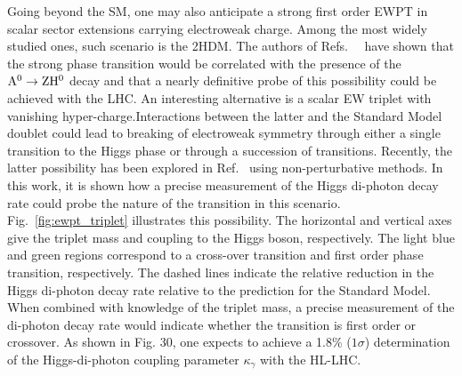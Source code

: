 Going beyond the SM, one may also anticipate a strong first order EWPT in scalar sector extensions carrying electroweak charge. Among the most widely studied ones, such scenario is the 2HDM. The authors of Refs.~~\cite{Dorsch:2013wja,Dorsch:2014qja} have shown that the strong phase transition would be correlated with the presence of the $\rm A^0\to Z H^0$ decay and that a nearly definitive probe of this possibility could be achieved with the LHC. An interesting alternative is a scalar EW triplet with vanishing hyper-charge.Interactions between the latter and the Standard Model doublet could lead to breaking of electroweak symmetry through either a single transition to the Higgs phase or through a succession of transitions\cite{Patel:2012pi}. Recently, the latter possibility has been explored in Ref.~\cite{Niemi:2018asa} using non-perturbative methods. In this work, it is shown how a precise measurement of the Higgs di-photon decay rate could probe the nature of the transition in this scenario. Fig.~\ref{fig:ewpt_triplet} illustrates this possibility. The horizontal and vertical axes give the triplet mass and coupling to the Higgs boson, respectively. The light blue and green regions correspond to a cross-over transition and first order phase transition, respectively. The dashed lines indicate the relative reduction in the Higgs di-photon decay rate relative to the prediction for the Standard Model. When combined with knowledge of the triplet mass, a precise measurement of the di-photon decay rate would indicate whether the transition is first order or crossover. As shown in Fig. 30, one expects to achieve a 1.8\% ($1\sigma$) determination of the Higgs-di-photon coupling parameter $\kappa_\gamma$ with the HL-LHC.



